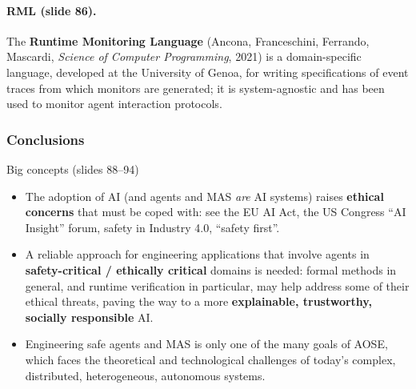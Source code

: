 \paragraph{RML (slide 86).} The \textbf{Runtime Monitoring Language} (Ancona, Franceschini,
Ferrando, Mascardi, \emph{Science of Computer Programming}, 2021) is a domain-specific
language, developed at the University of Genoa, for writing specifications of event traces
from which monitors are generated; it is system-agnostic and has been used to monitor agent
interaction protocols.

\subsubsection{Conclusions}

\begin{nbfact}{Big concepts (slides 88--94)}
\begin{itemize}[nosep]
  \item The adoption of AI (and agents and MAS \emph{are} AI systems) raises
        \textbf{ethical concerns} that must be coped with: see the EU AI Act, the US Congress
        ``AI Insight'' forum, safety in Industry 4.0, ``safety first''.
  \item A reliable approach for engineering applications that involve agents in
        \textbf{safety-critical / ethically critical} domains is needed: formal methods in
        general, and runtime verification in particular, may help address some of their
        ethical threats, paving the way to a more \textbf{explainable, trustworthy, socially
        responsible} AI.
  \item Engineering safe agents and MAS is only one of the many goals of AOSE, which faces the
        theoretical and technological challenges of today's complex, distributed,
        heterogeneous, autonomous systems.
\end{itemize}
\end{nbfact}
